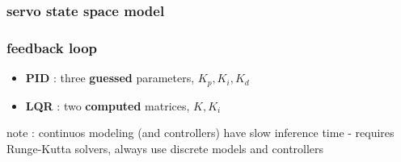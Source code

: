 \documentclass{beamer}
\begin{document}
\begin{frame}
  
  \frametitle{\bf servo state space model}

  
\end{frame}




\begin{frame}
  \frametitle{\bf feedback loop}


  \begin{itemize}
    \item {\bf PID} : three {\bf \color{red} guessed} parameters, $K_p, K_i, K_d$
    \item {\bf LQR} : two {\bf \color{red} computed} matrices, $K, K_i$
  \end{itemize}

  note : continuos modeling (and controllers) have slow inference time - requires Runge-Kutta solvers,
  always use discrete models and controllers
\end{frame}
\end{document}
